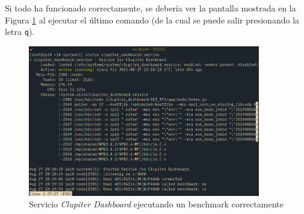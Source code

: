 Si todo ha funcionado correctamente, se debería ver la pantalla mostrada en la Figura \ref{fig:systemd_clupiter_dashboard} al ejecutar el último comando (de la cual se puede salir presionando la letra \texttt{q}).

\begin{figure}[h!]
  \centering
  \vspace*{0.5cm}
  \includegraphics[width=0.9\textwidth]{img/systemd_clupiter_dashboard.png}
  \caption{Servicio \textit{Clupiter Dashboard} ejecutando un benchmark correctamente}
  \label{fig:systemd_clupiter_dashboard}
\end{figure}

